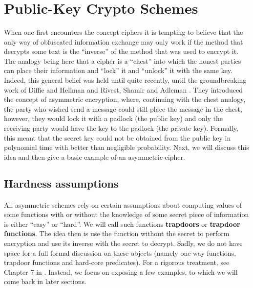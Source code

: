 \documentclass{article}
\theoremstyle{definition}
\begin{document}
\section{Public-Key Crypto Schemes}
\paragraph{} When one first encounters the concept ciphers it is tempting to believe that
the only way of obfuscated information exchange may only work if the method that
decrypts some text is the ``inverse'' of the method that was used to encrypt it.
The analogy being here that a cipher is a ``chest'' into which the honest
parties can place their information and ``lock'' it and ``unlock'' it with the
same key. Indeed, this general belief was held until quite recently, until the
groundbreaking work of Diffie and Hellman \cite{diffie1976new} and Rivest,
Shamir and Adleman \cite{rivest1978method}. They introduced the concept of
asymmetric encryption, where, continuing with the chest analogy, the party who
wished send a message could still place the message in the chest, however, they
would lock it with a padlock (the public key) and only the receiving party would
have the key to the padlock (the private key). Formally, this meant that the
secret key could not be obtained from the public key in polynomial time with
better than negligible probability. Next, we will discuss this idea and then
give a basic example of an asymmetric cipher.
\subsection{Hardness assumptions}
\paragraph{} All asymmetric schemes rely on certain assumptions about computing
values of some functions with or without the knowledge of some secret piece of
information is either ``easy'' or ``hard''. We will call such functions
\textbf{trapdoors} or \textbf{trapdoor functions}. The idea then is use the
function without the secret to perform encryption and use its inverse with the
secret to decrypt. Sadly, we do not have space for a
full formal discussion on these objects (namely one-way functions, trapdoor
functions and hard-core predicates). For a rigorous treatment, see Chapter 7 in \cite{katz2014introduction}.
Instead, we focus on exposing a few examples, to which we will come back in
later sections.
\end{document}
